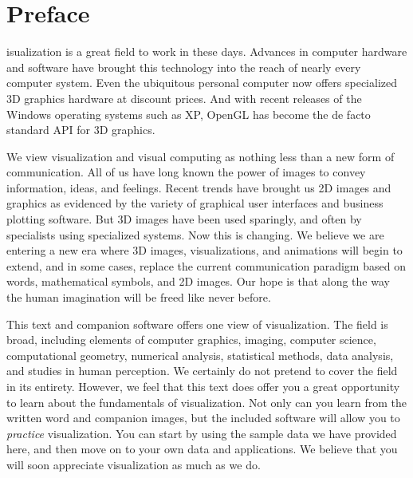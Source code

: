 
\chapter*{Preface}
\markright{}

\setlength\parindent{24pt}
isualization is a great field to work in these days. Advances in computer hardware and software have brought this technology into the reach of nearly every computer system. Even the ubiquitous personal computer now offers specialized 3D graphics hardware at discount prices. And with recent releases of the Windows operating systems such as XP, OpenGL has become the de facto standard \gls{API} for 3D graphics.

 We view visualization and visual computing as nothing less than a new form of communication. All of us have long known the power of images to convey information, ideas, and feelings. Recent trends have brought us 2D images and graphics as evidenced by the variety of graphical user interfaces and business plotting software. But 3D images have been used sparingly, and often by specialists using specialized systems. Now this is changing. We believe we are entering a new era where 3D images, visualizations, and animations will begin to extend, and in some cases, replace the current communication paradigm based on words, mathematical symbols, and 2D images. Our hope is that along the way the human imagination will be freed like never before.

This text and companion software offers one view of visualization. The field is broad, including elements of computer graphics, imaging, computer science, computational geometry, numerical analysis, statistical methods, data analysis, and studies in human perception. We certainly do not pretend to cover the field in its entirety. However, we feel that this text does offer you a great opportunity to learn about the fundamentals of visualization. Not only can you learn from the written word and companion images, but the included software will allow you to \textit{practice} visualization. You can start by using the sample data we have provided here, and then move on to your own data and applications. We believe that you will soon appreciate visualization as much as we do.

